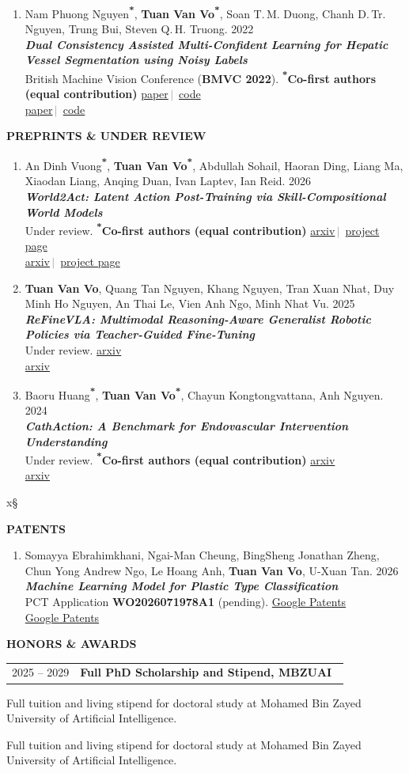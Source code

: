 \documentclass[10pt,a4paper]{article}
\makeatletter
\newcommand{\link}[2]{\href{#1}{\textcolor{linkblue}{#2}}}
\newcommand{\hl}[1]{\textcolor{hlred}{\textbf{#1}}}
\newcommand{\sep}{\,\textcolor{gray}{$|$}\,}
\newcommand{\eq}{\textsuperscript{\textcolor{hlred}{\textbf{*}}}}
\newcommand{\cofirst}{\hl{\textsuperscript{*}Co-first authors (equal contribution)}}
\newcommand{\me}{\textbf{Tuan Van Vo}}
\newcommand{\cvsection}[1]{%
  \vspace{10pt}\par\Needspace{6\baselineskip}\noindent
  {\small\bfseries\MakeUppercase{#1}}%
  \hspace{6pt}{\color{rulegray}\leaders\hrule height 0.6pt\hfill\kern0pt}%
  \par\vspace{6pt}%
}
\newlength{\datecol}\setlength{\datecol}{1.12in}
\newlength{\colgap}\setlength{\colgap}{8pt}
\newcommand{\cventryhead}[3]{%
  \noindent
  \begin{tabularx}{\linewidth}{@{}p{\datecol}@{\hspace{\colgap}}X@{}}
    \small #1 & \textbf{#2}\hfill{\scriptsize\bfseries\ #3} \\
  \end{tabularx}\par}
\newcommand{\cventry}[4]{%
  \Needspace{3\baselineskip}%
  \cventryhead{#1}{#2}{#3}%
  \def\cvbody{#4}%
  \ifx\cvbody\empty\else
    \vspace{1pt}\noindent\hspace*{\dimexpr\datecol+\colgap\relax}%
    \begin{minipage}[t]{\dimexpr\linewidth-\datecol-\colgap\relax}#4\end{minipage}\par
  \fi
  \vspace{8pt}%
}
\newenvironment{publist}{%
  \begin{enumerate}[leftmargin=0.38in,itemsep=7pt,topsep=2pt,
                    label=\arabic*.]\small
}{\end{enumerate}}
\newcommand{\pub}[4]{%
  \Needspace{5\baselineskip}\item #1\\
  \textbf{\textit{#2}}\\
  #3%
  \ifx\relax#4\relax\else\\ #4\fi
}
\makeatother
\begin{document}
\begin{publist}
  \pub{Nam Phuong Nguyen\eq, \me\eq, Soan T.\,M. Duong, Chanh D.\,Tr. Nguyen, Trung Bui, Steven Q.\,H. Truong. 2022}
      {Dual Consistency Assisted Multi-Confident Learning for Hepatic Vessel Segmentation using Noisy Labels}
      {British Machine Vision Conference (\textbf{BMVC 2022}). \cofirst}
      {\link{https://bmvc2022.mpi-inf.mpg.de/0725.pdf}{paper}\sep
       \link{https://github.com/VinBrainJSC/DualConsistency_Mutil-CL}{code}}
\end{publist}

\cvsection{Preprints \& Under Review}

\begin{publist}
  \pub{An Dinh Vuong\eq, \me\eq, Abdullah Sohail, Haoran Ding, Liang Ma, Xiaodan Liang, Anqing Duan, Ivan Laptev, Ian Reid. 2026}
      {World2Act: Latent Action Post-Training via Skill-Compositional World Models}
      {Under review. \cofirst}
      {\link{https://arxiv.org/abs/2603.10422}{arxiv}\sep
       \link{https://wm2act.github.io/}{project page}}

  \pub{\me, Quang Tan Nguyen, Khang Nguyen, Tran Xuan Nhat, Duy Minh Ho Nguyen, An Thai Le, Vien Anh Ngo, Minh Nhat Vu. 2025}
      {ReFineVLA: Multimodal Reasoning-Aware Generalist Robotic Policies via Teacher-Guided Fine-Tuning}
      {Under review.}
      {\link{https://arxiv.org/abs/2505.19080}{arxiv}}

  \pub{Baoru Huang\eq, \me\eq, Chayun Kongtongvattana, Anh Nguyen. 2024}
      {CathAction: A Benchmark for Endovascular Intervention Understanding}
      {Under review. \cofirst}
      {\link{https://arxiv.org/abs/2408.13126}{arxiv}}
\end{publist}

x§\cvsection{Patents}

\begin{publist}
  \pub{Somayya Ebrahimkhani, Ngai-Man Cheung, BingSheng Jonathan Zheng, Chun Yong Andrew Ngo, Le Hoang Anh, \me, U-Xuan Tan. 2026}
      {Machine Learning Model for Plastic Type Classification}
      {PCT Application \textbf{WO2026071978A1} (pending).}
      {\link{https://patents.google.com/patent/WO2026071978A1/en}{Google Patents}}
\end{publist}

\cvsection{Honors \& Awards}

\cventry{2025 -- 2029}
  {Full PhD Scholarship and Stipend, MBZUAI}{}
  {Full tuition and living stipend for doctoral study at Mohamed Bin Zayed University of Artificial Intelligence.}
\end{document}
